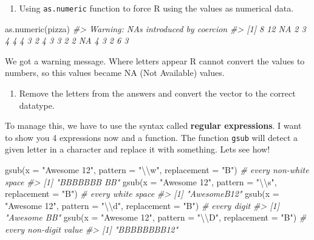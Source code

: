 \documentclass[
]{article}
\newenvironment{Shaded}{\begin{snugshade}}{\end{snugshade}}
\newcommand{\AttributeTok}[1]{\textcolor[rgb]{0.77,0.63,0.00}{#1}}
\newcommand{\CommentTok}[1]{\textcolor[rgb]{0.56,0.35,0.01}{\textit{#1}}}
\newcommand{\FunctionTok}[1]{\textcolor[rgb]{0.00,0.00,0.00}{#1}}
\newcommand{\NormalTok}[1]{#1}
\newcommand{\SpecialCharTok}[1]{\textcolor[rgb]{0.00,0.00,0.00}{#1}}
\newcommand{\StringTok}[1]{\textcolor[rgb]{0.31,0.60,0.02}{#1}}
\providecommand{\tightlist}{%
  \setlength{\itemsep}{0pt}\setlength{\parskip}{0pt}}
\begin{document}
\begin{enumerate}
\def\labelenumi{\arabic{enumi}.}
\tightlist
\item
  Using \texttt{as.numeric} function to force R using the values as numerical data.
\end{enumerate}

\begin{Shaded}
\begin{Highlighting}[]
\FunctionTok{as.numeric}\NormalTok{(pizza)}
\CommentTok{\#\textgreater{} Warning: NAs introduced by coercion}
\CommentTok{\#\textgreater{}  [1]  8 12 NA  2  3  4  4  4  3  2  4  3  3  2  2 NA  4  3  2  6  3}
\end{Highlighting}
\end{Shaded}

We got a warning message. Where letters appear R cannot convert the values to numbers, so this values became NA (Not Available) values.

\begin{enumerate}
\def\labelenumi{\arabic{enumi}.}
\setcounter{enumi}{1}
\tightlist
\item
  Remove the letters from the answers and convert the vector to the correct datatype.
\end{enumerate}

To manage this, we have to use the syntax called \textbf{regular expressions}. I want to show you 4 expressions now and a function. The function \texttt{gsub} will detect a given letter in a character and replace it with something. Lets see how!

\begin{Shaded}
\begin{Highlighting}[]
\FunctionTok{gsub}\NormalTok{(}\AttributeTok{x =} \StringTok{"Awesome 12"}\NormalTok{, }\AttributeTok{pattern =} \StringTok{"}\SpecialCharTok{\textbackslash{}\textbackslash{}}\StringTok{w"}\NormalTok{, }\AttributeTok{replacement =} \StringTok{"B"}\NormalTok{) }\CommentTok{\# every non{-}white space}
\CommentTok{\#\textgreater{} [1] "BBBBBBB BB"}
\FunctionTok{gsub}\NormalTok{(}\AttributeTok{x =} \StringTok{"Awesome 12"}\NormalTok{, }\AttributeTok{pattern =} \StringTok{"}\SpecialCharTok{\textbackslash{}\textbackslash{}}\StringTok{s"}\NormalTok{, }\AttributeTok{replacement =} \StringTok{"B"}\NormalTok{) }\CommentTok{\# every white space}
\CommentTok{\#\textgreater{} [1] "AwesomeB12"}
\FunctionTok{gsub}\NormalTok{(}\AttributeTok{x =} \StringTok{"Awesome 12"}\NormalTok{, }\AttributeTok{pattern =} \StringTok{"}\SpecialCharTok{\textbackslash{}\textbackslash{}}\StringTok{d"}\NormalTok{, }\AttributeTok{replacement =} \StringTok{"B"}\NormalTok{) }\CommentTok{\# every digit}
\CommentTok{\#\textgreater{} [1] "Awesome BB"}
\FunctionTok{gsub}\NormalTok{(}\AttributeTok{x =} \StringTok{"Awesome 12"}\NormalTok{, }\AttributeTok{pattern =} \StringTok{"}\SpecialCharTok{\textbackslash{}\textbackslash{}}\StringTok{D"}\NormalTok{, }\AttributeTok{replacement =} \StringTok{"B"}\NormalTok{) }\CommentTok{\# every non{-}digit value}
\CommentTok{\#\textgreater{} [1] "BBBBBBBB12"}
\end{Highlighting}
\end{Shaded}
\end{document}
